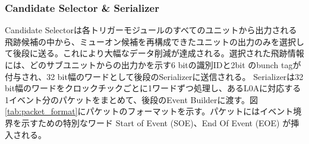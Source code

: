 \subsubsection*{Candidate Selector \& Serializer}
    Candidate Selectorは各トリガーモジュールのすべてのユニットから出力される飛跡候補の中から、ミューオン候補を再構成できたユニットの出力のみを選択して後段に送る。これにより大幅なデータ削減が達成される。選択された飛跡情報には、どのサブユニットからの出力かを示す6 bitの識別IDと2bit のbunch tagが付与され、32 bit幅のワードとして後段のSerializerに送信される。
    Serializerは32 bit幅のワードをクロックチックごとに1ワードずつ処理し、あるL0Aに対応する1イベント分のパケットをまとめて、後段のEvent Builderに渡す。図\ref{tab:packet_format}にパケットのフォーマットを示す。パケットにはイベント境界を示すための特別なワード Start of Event (SOE)、End Of Event (EOE) が挿入される。

